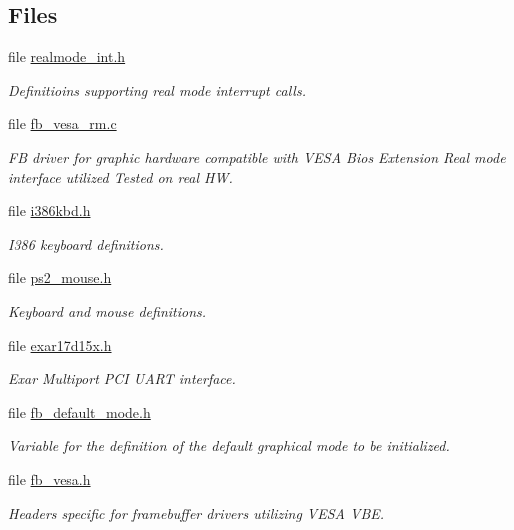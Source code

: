 \subsection*{Files}
\begin{DoxyCompactItemize}
\item 
file \mbox{\hyperlink{realmode__int_8h}{realmode\+\_\+int.\+h}}
\begin{DoxyCompactList}\small\item\em Definitioins supporting real mode interrupt calls. \end{DoxyCompactList}\item 
file \mbox{\hyperlink{fb__vesa__rm_8c}{fb\+\_\+vesa\+\_\+rm.\+c}}
\begin{DoxyCompactList}\small\item\em FB driver for graphic hardware compatible with V\+E\+SA Bios Extension Real mode interface utilized Tested on real HW. \end{DoxyCompactList}\item 
file \mbox{\hyperlink{i386kbd_8h}{i386kbd.\+h}}
\begin{DoxyCompactList}\small\item\em I386 keyboard definitions. \end{DoxyCompactList}\item 
file \mbox{\hyperlink{ps2__mouse_8h}{ps2\+\_\+mouse.\+h}}
\begin{DoxyCompactList}\small\item\em Keyboard and mouse definitions. \end{DoxyCompactList}\item 
file \mbox{\hyperlink{exar17d15x_8h}{exar17d15x.\+h}}
\begin{DoxyCompactList}\small\item\em Exar Multiport P\+CI U\+A\+RT interface. \end{DoxyCompactList}\item 
file \mbox{\hyperlink{fb__default__mode_8h}{fb\+\_\+default\+\_\+mode.\+h}}
\begin{DoxyCompactList}\small\item\em Variable for the definition of the default graphical mode to be initialized. \end{DoxyCompactList}\item 
file \mbox{\hyperlink{fb__vesa_8h}{fb\+\_\+vesa.\+h}}
\begin{DoxyCompactList}\small\item\em Headers specific for framebuffer drivers utilizing V\+E\+SA V\+BE. \end{DoxyCompactList}\item 

\end{DoxyCompactItemize}
